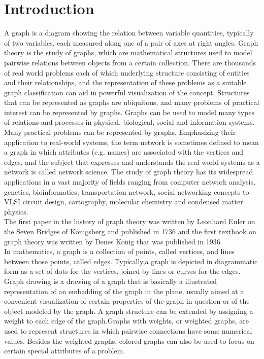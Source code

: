 \chapter{Introduction}\label{intro}


A graph is a diagram showing the relation between variable quantities, typically of two variables, each measured along one of a pair of axes at right angles. Graph theory is the study of graphs, which are mathematical structures used to model pairwise relations between objects from a certain collection. There are thousands of real world problems each of which underlying structure consisting of entities and their relationships, and the representation of these problems as a suitable graph classification can aid in powerful visualization of the concept. Structures that can be represented as graphs are ubiquitous, and many problems of practical interest can be represented by graphs. Graphs can be used to model many types of relations and processes in physical, biological, social and information systems. Many practical problems can be represented by graphs. Emphasizing their application to real-world systems, the term network is sometimes defined to mean a graph in which attributes (e.g. names) are associated with the vertices and edges, and the subject that expresses and understands the real-world systems as a network is called network science. The study of graph theory has its widespread applications in a vast majority of fields ranging from computer network analysis, genetics, bioinformatics, transportation network, social networking concepts to VLSI circuit design, cartography, molecular chemistry and condensed matter physics.
\\


The first paper in the history of graph theory was written by Leonhard Euler \cite{Biggs} on the Seven Bridges of Konigsberg and published in 1736 and the first textbook on graph theory was written by Denes  Konig \cite{Tutte} that was published in 1936.\\


In mathematics, a graph is a collection of points, called vertices, and lines between those points, called edges. Typically,a graph is depicted in diagrammatic form as a set of dots for the vertices, joined by lines or curves for the edges. Graph drawing is a drawing of a graph that is basically a illustrated representation of an embedding of the graph in the plane, usually aimed at a convenient visualization of certain properties of the graph in question or of the object modeled by the graph. A graph structure can be extended by assigning a weight to each edge of the graph.Graphs with weights, or weighted graphs, are used to represent structures in which pairwise connections have some numerical values. Besides the weighted graphs, colored graphs can also be used to focus on certain special attributes of a problem.
\\


